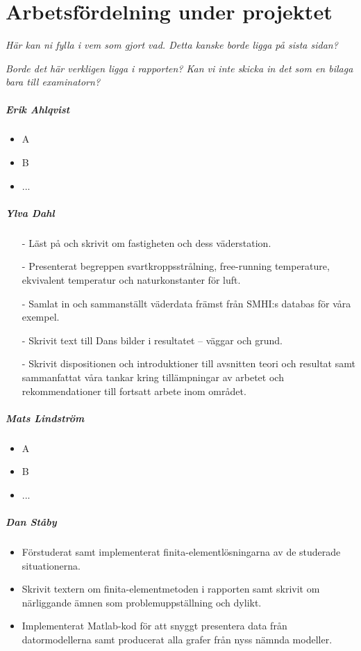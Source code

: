 \chapter{Arbetsfördelning under projektet}

\emph{\color{red}Här kan ni fylla i vem som gjort vad. Detta kanske borde ligga på sista sidan?}

\emph{\color{blue} Borde det här verkligen ligga i rapporten? Kan vi inte skicka in det som en bilaga bara till examinatorn?}


\paragraph{Erik Ahlqvist}
\begin{itemize}
\item A
\item B
\item ...
\end{itemize}


\paragraph{Ylva Dahl}
\begin{itemize}
\item[-] Läst på och skrivit om fastigheten och dess väderstation.
\item[-] Presenterat begreppen svartkroppsstrålning, free-running temperature, ekvivalent temperatur och naturkonstanter för luft.
\item[-] Samlat in och sammanställt väderdata främst från SMHI:s databas för våra exempel.
\item[-] Skrivit text till Dans bilder i resultatet – väggar och grund.
\item[-] Skrivit dispositionen och introduktioner till avsnitten teori och resultat samt sammanfattat våra tankar kring tillämpningar av arbetet och rekommendationer till fortsatt arbete inom området.
\end{itemize}


\paragraph{Mats Lindström}
\begin{itemize}
\item A
\item B
\item ...
\end{itemize}


\paragraph{Dan Ståby}
\begin{itemize}
\item Förstuderat samt implementerat finita-elementlösningarna av de studerade situationerna.
\item Skrivit textern om finita-elementmetoden i rapporten samt skrivit om närliggande ämnen som problemuppställning och dylikt. 
\item Implementerat Matlab-kod för att snyggt presentera data från datormodellerna samt producerat alla grafer från
nyss nämnda modeller.
\end{itemize}
